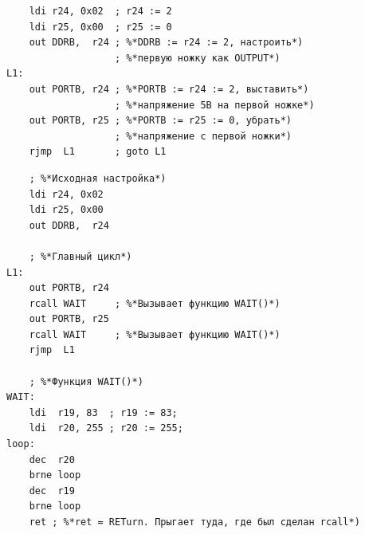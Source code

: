 \documentclass[aspectratio=169, pdf, 8pt, unicode]{beamer}
\begin{document}
\begin{frame}[fragile]
	\begin{lstlisting}
    ldi r24, 0x02  ; r24 := 2
    ldi r25, 0x00  ; r25 := 0
    out DDRB,  r24 ; %*DDRB := r24 := 2, настроить*)
                   ; %*первую ножку как OUTPUT*)
L1:
    out PORTB, r24 ; %*PORTB := r24 := 2, выставить*)
                   ; %*напряжение 5В на первой ножке*)
    out PORTB, r25 ; %*PORTB := r25 := 0, убрать*)
                   ; %*напряжение с первой ножки*)
    rjmp  L1       ; goto L1
	\end{lstlisting}
\end{frame}

\begin{frame}[fragile]
	\begin{lstlisting}
    ; %*Исходная настройка*)
    ldi r24, 0x02
    ldi r25, 0x00
    out DDRB,  r24

    ; %*Главный цикл*)
L1:
    out PORTB, r24
    rcall WAIT     ; %*Вызывает функцию WAIT()*)
    out PORTB, r25
    rcall WAIT     ; %*Вызывает функцию WAIT()*)
    rjmp  L1

    ; %*Функция WAIT()*)
WAIT:
    ldi  r19, 83  ; r19 := 83;
    ldi  r20, 255 ; r20 := 255;
loop:
    dec  r20
    brne loop
    dec  r19
    brne loop
    ret ; %*ret = RETurn. Прыгает туда, где был сделан rcall*)
	\end{lstlisting}
\end{frame}
\end{document}
